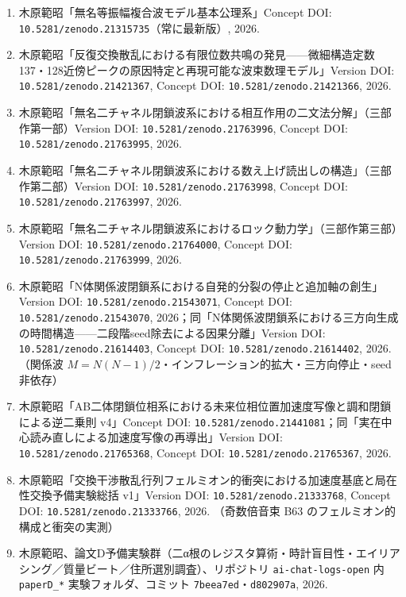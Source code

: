 \documentclass[
  a4paper,
]{ltjsarticle}
\providecommand{\tightlist}{%
  \setlength{\itemsep}{0pt}\setlength{\parskip}{0pt}}
\begin{document}
\begin{enumerate}
\def\labelenumi{\arabic{enumi}.}
\tightlist
\item
  木原範昭「無名等振幅複合波モデル基本公理系」Concept DOI:
  \texttt{10.5281/zenodo.21315735}（常に最新版）, 2026.
\item
  木原範昭「反復交換散乱における有限位数共鳴の発見------微細構造定数137・128近傍ピークの原因特定と再現可能な波束数理モデル」Version
  DOI: \texttt{10.5281/zenodo.21421367}, Concept DOI:
  \texttt{10.5281/zenodo.21421366}, 2026.
\item
  木原範昭「無名二チャネル閉鎖波系における相互作用の二文法分解」（三部作第一部）Version
  DOI: \texttt{10.5281/zenodo.21763996}, Concept DOI:
  \texttt{10.5281/zenodo.21763995}, 2026.
\item
  木原範昭「無名二チャネル閉鎖波系における数え上げ読出しの構造」（三部作第二部）Version
  DOI: \texttt{10.5281/zenodo.21763998}, Concept DOI:
  \texttt{10.5281/zenodo.21763997}, 2026.
\item
  木原範昭「無名二チャネル閉鎖波系におけるロック動力学」（三部作第三部）Version
  DOI: \texttt{10.5281/zenodo.21764000}, Concept DOI:
  \texttt{10.5281/zenodo.21763999}, 2026.
\item
  木原範昭「N体関係波閉鎖系における自発的分裂の停止と追加軸の創生」Version
  DOI: \texttt{10.5281/zenodo.21543071}, Concept DOI:
  \texttt{10.5281/zenodo.21543070},
  2026；同「N体関係波閉鎖系における三方向生成の時間構造------二段階seed除去による因果分離」Version
  DOI: \texttt{10.5281/zenodo.21614403}, Concept DOI:
  \texttt{10.5281/zenodo.21614402}, 2026. （関係波
  \(M=N(N-1)/2\)・インフレーション的拡大・三方向停止・seed非依存）
\item
  木原範昭「AB二体閉鎖位相系における未来位相位置加速度写像と調和閉鎖による逆二乗則
  v4」Concept DOI:
  \texttt{10.5281/zenodo.21441081}；同「実在中心読み直しによる加速度写像の再導出」Version
  DOI: \texttt{10.5281/zenodo.21765368}, Concept DOI:
  \texttt{10.5281/zenodo.21765367}, 2026.
\item
  木原範昭「交換干渉散乱行列フェルミオン的衝突における加速度基底と局在性交換予備実験総括
  v1」Version DOI: \texttt{10.5281/zenodo.21333768}, Concept DOI:
  \texttt{10.5281/zenodo.21333766}, 2026. （奇数倍音束 B63
  のフェルミオン的構成と衝突の実測）
\item
  木原範昭、論文D予備実験群（二α根のレジスタ算術・時計盲目性・エイリアシング／質量ビート／住所選別調査）、リポジトリ
  \texttt{ai-chat-logs-open} 内 \texttt{paperD\_*}
  実験フォルダ、コミット \texttt{7beea7ed}・\texttt{d802907a}, 2026.
\end{enumerate}
\end{document}
